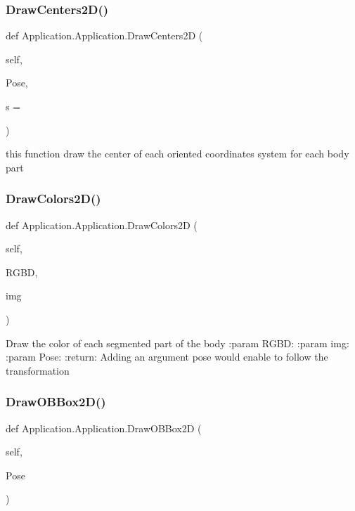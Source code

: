\subsubsection{\texorpdfstring{Draw\+Centers2\+D()}{DrawCenters2D()}}
{\footnotesize\ttfamily def Application.\+Application.\+Draw\+Centers2D (\begin{DoxyParamCaption}\item[{}]{self,  }\item[{}]{Pose,  }\item[{}]{s = {} }\end{DoxyParamCaption})}

\begin{DoxyVerb}this function draw the center of each oriented coordinates system for each body part\end{DoxyVerb}
 \mbox{\label{class_application_1_1_application_a935ca95709286fee970c85727bf5bab4}} 
\subsubsection{\texorpdfstring{Draw\+Colors2\+D()}{DrawColors2D()}}
{\footnotesize\ttfamily def Application.\+Application.\+Draw\+Colors2D (\begin{DoxyParamCaption}\item[{}]{self,  }\item[{}]{R\+G\+BD,  }\item[{}]{img }\end{DoxyParamCaption})}

\begin{DoxyVerb}Draw the color of each segmented part of the body
:param RGBD:
:param img:
:param Pose:
:return:
Adding an argument pose would enable to follow the transformation
\end{DoxyVerb}
 \mbox{\label{class_application_1_1_application_a766ac4121a3cd61ad34b957bced90427}} 
\subsubsection{\texorpdfstring{Draw\+O\+B\+Box2\+D()}{DrawOBBox2D()}}
{\footnotesize\ttfamily def Application.\+Application.\+Draw\+O\+B\+Box2D (\begin{DoxyParamCaption}\item[{}]{self,  }\item[{}]{Pose }\end{DoxyParamCaption})}

